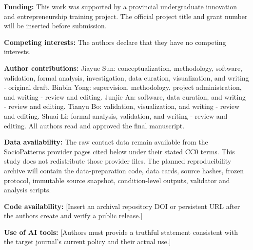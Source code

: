 \documentclass[smallextended]{svjour3}
\begin{document}
\textbf{Funding:} This work was supported by a provincial undergraduate innovation and entrepreneurship training project. The official project title and grant number will be inserted before submission.

\textbf{Competing interests:} The authors declare that they have no competing interests.

\textbf{Author contributions:} Jiayue Sun: conceptualization, methodology, software, validation, formal analysis, investigation, data curation, visualization, and writing - original draft. Binbin Yong: supervision, methodology, project administration, and writing - review and editing. Junjie An: software, data curation, and writing - review and editing. Tianyu Bo: validation, visualization, and writing - review and editing. Shuai Li: formal analysis, validation, and writing - review and editing. All authors read and approved the final manuscript.

\textbf{Data availability:} The raw contact data remain available from the SocioPatterns provider pages cited below under their stated CC0 terms. This study does not redistribute those provider files. The planned reproducibility archive will contain the data-preparation code, data cards, source hashes, frozen protocol, immutable source snapshot, condition-level outputs, validator and analysis scripts.

\textbf{Code availability:} [Insert an archival repository DOI or persistent URL after the authors create and verify a public release.]

\textbf{Use of AI tools:} [Authors must provide a truthful statement consistent with the target journal's current policy and their actual use.]

\FloatBarrier
\end{document}
